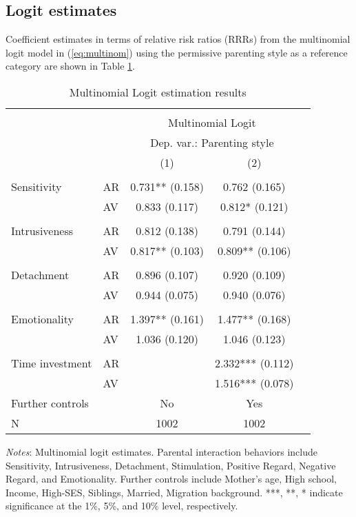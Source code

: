 \subsection{Logit estimates}
Coefficient estimates in terms of relative risk ratios (RRRs) from the multinomial logit model in (\ref{eq:multinom}) using the permissive parenting style as a reference category are shown in Table \ref{tab:res}.  
%
\begin{table}[!htbp]
	\centering
	\begin{threeparttable}
		\caption{Multinomial Logit estimation results}
		\label{tab:res}
		\begin{tabular}[t]{llccc}
			\hline \hline \\[-1.8ex]
			&    &  \multicolumn{2}{c}{Multinomial Logit}\\
			&    &  \multicolumn{2}{c}{Dep. var.: Parenting style}\\
			&    & (1) & (2) \\
			\cline{3-4} \\[-1.8ex]
			Sensitivity & AR & 0.731** (0.158) & 0.762 (0.165)\\
			& AV & 0.833 (0.117) & 0.812* (0.121)\\
			&  &  \vphantom{4} & \\
			Intrusiveness & AR & 0.812 (0.138) & 0.791 (0.144)\\
			& AV & 0.817** (0.103) & 0.809** (0.106)\\
			&  &  \vphantom{3} & \\
			Detachment & AR & 0.896 (0.107) & 0.920 (0.109)\\
			& AV & 0.944 (0.075) & 0.940 (0.076)\\
			&  &  \vphantom{2} & \\
			Emotionality & AR & 1.397** (0.161) & 1.477** (0.168)\\
			& AV & 1.036 (0.120) & 1.046 (0.123)\\
			&  &  \vphantom{1} & \\
			Time investment & AR &  & 2.332*** (0.112)\\
			& AV &  & 1.516*** (0.078)\\
			\midrule
			Further controls &  & No & Yes\\
			N &  & 1002 & 1002\\
			\bottomrule
		\end{tabular}
		\begin{tablenotes}
			\small
			\item \textit{Notes}: Multinomial logit estimates. Parental interaction behaviors include Sensitivity, Intrusiveness, Detachment, Stimulation,
			Positive Regard, Negative Regard, and Emotionality. Further controls include Mother's age, High school, Income, High-SES, Siblings,
			Married, Migration background.
			 ***, **, * indicate significance at the 1\%, 5\%, and 10\% level,
			respectively.
		\end{tablenotes}
	\end{threeparttable}
\end{table}
